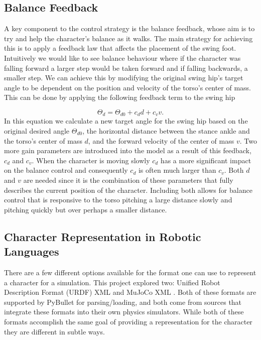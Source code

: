 \documentclass[12pt, a4paper]{article}
\begin{document}
\subsection{Balance Feedback}
A key component to the control strategy is the balance feedback, whose aim is to try and help the character's balance as it walks. The main strategy for achieving this is to apply a feedback law that affects the placement of the swing foot. Intuitively we would like to see balance behaviour where if the character was falling forward a larger step would be taken forward and if falling backwards, a smaller step. We can achieve this by modifying the original swing hip's target angle to be dependent on the position and velocity of the torso's center of mass. This can be done by applying the following feedback term to the swing hip

\begin{equation}
\Theta_d = \Theta_{d0} + c_dd+ c_vv.
\label{eqn: balance feedback}
\end{equation}
\noindent
In this equation we calculate a new target angle for the swing hip based on the original desired angle $\Theta_{d0}$, the horizontal distance between the stance ankle and the torso's center of mass $d$, and the forward velocity of the center of mass $v$. Two more gain parameters are introduced into the model as a result of this feedback, $c_d$ and $c_v$. When the character is moving slowly $c_d$ has a more significant impact on the balance control and consequently $c_d$ is often much larger than $c_v$. Both $d$ and $v$ are needed since it is the combination of these parameters that fully describes the current position of the character. Including both allows for balance control that is responsive to the torso pitching a large distance slowly and pitching quickly but over perhaps a smaller distance. 

\subsection{Character Representation in Robotic Languages}
There are a few different options available for the format one can use to represent a character for a simulation. This project explored two: Unified Robot Description Format (URDF) XML \cite{urdf} and MuJoCo XML \cite{mujoco}. Both of these formats are supported by PyBullet for parsing/loading, and both come from sources that integrate these formats into their own physics simulators. While both of these formats accomplish the same goal of providing a representation for the character they are different in subtle ways.\\
\end{document}
